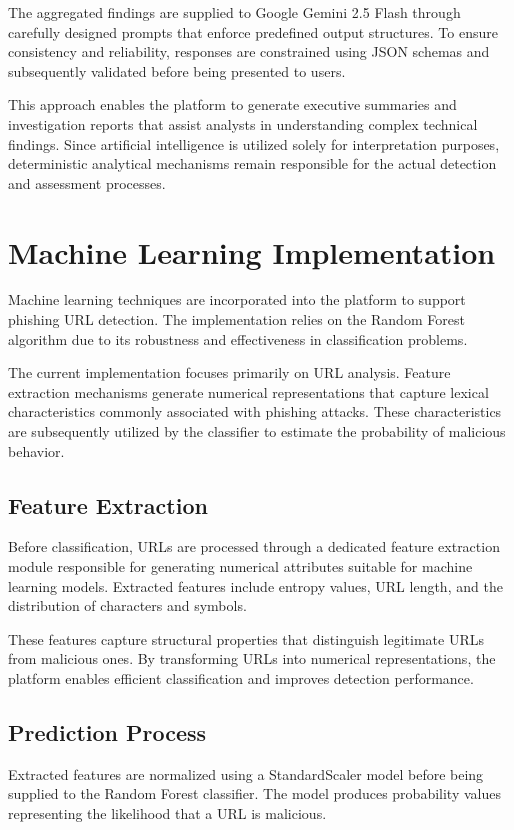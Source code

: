 The aggregated findings are supplied to Google Gemini 2.5 Flash through carefully designed prompts that enforce predefined output structures. To ensure consistency and reliability, responses are constrained using JSON schemas and subsequently validated before being presented to users.

This approach enables the platform to generate executive summaries and investigation reports that assist analysts in understanding complex technical findings. Since artificial intelligence is utilized solely for interpretation purposes, deterministic analytical mechanisms remain responsible for the actual detection and assessment processes.

\section{Machine Learning Implementation}
Machine learning techniques are incorporated into the platform to support phishing URL detection. The implementation relies on the Random Forest algorithm due to its robustness and effectiveness in classification problems.

The current implementation focuses primarily on URL analysis. Feature extraction mechanisms generate numerical representations that capture lexical characteristics commonly associated with phishing attacks. These characteristics are subsequently utilized by the classifier to estimate the probability of malicious behavior.

\subsection{Feature Extraction}
Before classification, URLs are processed through a dedicated feature extraction module responsible for generating numerical attributes suitable for machine learning models. Extracted features include entropy values, URL length, and the distribution of characters and symbols.

These features capture structural properties that distinguish legitimate URLs from malicious ones. By transforming URLs into numerical representations, the platform enables efficient classification and improves detection performance.

\subsection{Prediction Process}
Extracted features are normalized using a StandardScaler model before being supplied to the Random Forest classifier. The model produces probability values representing the likelihood that a URL is malicious.

